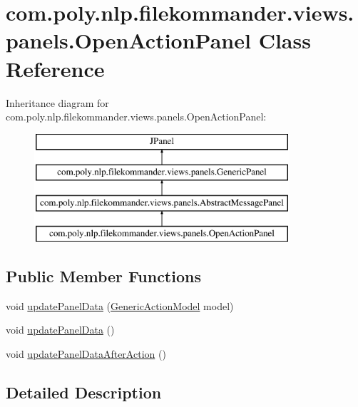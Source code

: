 \hypertarget{classcom_1_1poly_1_1nlp_1_1filekommander_1_1views_1_1panels_1_1_open_action_panel}{\section{com.\-poly.\-nlp.\-filekommander.\-views.\-panels.\-Open\-Action\-Panel Class Reference}
\label{classcom_1_1poly_1_1nlp_1_1filekommander_1_1views_1_1panels_1_1_open_action_panel}
}
Inheritance diagram for com.\-poly.\-nlp.\-filekommander.\-views.\-panels.\-Open\-Action\-Panel\-:\begin{figure}[H]
\begin{center}
\leavevmode
\includegraphics[height=4.000000cm]{classcom_1_1poly_1_1nlp_1_1filekommander_1_1views_1_1panels_1_1_open_action_panel}
\end{center}
\end{figure}
\subsection*{Public Member Functions}
\begin{DoxyCompactItemize}
\item 
void \hyperlink{classcom_1_1poly_1_1nlp_1_1filekommander_1_1views_1_1panels_1_1_open_action_panel_aba56569929488006bc879522f8d65da8}{update\-Panel\-Data} (\hyperlink{interfacecom_1_1poly_1_1nlp_1_1filekommander_1_1views_1_1models_1_1_generic_action_model}{Generic\-Action\-Model} model)
\item 
void \hyperlink{classcom_1_1poly_1_1nlp_1_1filekommander_1_1views_1_1panels_1_1_open_action_panel_a1e8521089a09fd734402e62d2352c275}{update\-Panel\-Data} ()
\item 
void \hyperlink{classcom_1_1poly_1_1nlp_1_1filekommander_1_1views_1_1panels_1_1_open_action_panel_aa37ab18925690ab2ed3ba3f1071126b2}{update\-Panel\-Data\-After\-Action} ()
\end{DoxyCompactItemize}


\subsection{Detailed Description}


